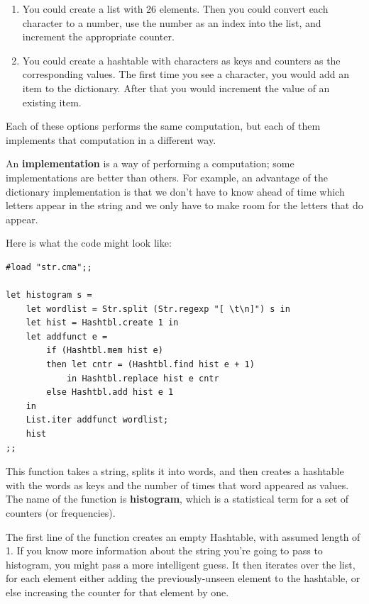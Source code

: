 \documentclass[10pt]{book}
\begin{document}
{\begin{enumerate}
\item You could create a list with 26 elements.  Then you could
convert each character to a number, use the number as an index 
into the list, and increment the appropriate counter.

\item You could create a hashtable with characters as keys
and counters as the corresponding values.  The first time you
see a character, you would add an item to the dictionary.  After
that you would increment the value of an existing item.

\end{enumerate}

Each of these options performs the same computation, but each
of them implements that computation in a different way.


An {\bf implementation} is a way of performing a computation;
some implementations are better than others.  For example,
an advantage of the dictionary implementation is that we don't
have to know ahead of time which letters appear in the string
and we only have to make room for the letters that do appear.

Here is what the code might look like:

\beforeverb
\begin{verbatim}
#load "str.cma";;

let histogram s = 
	let wordlist = Str.split (Str.regexp "[ \t\n]") s in
	let hist = Hashtbl.create 1 in
	let addfunct e = 
		if (Hashtbl.mem hist e)
		then let cntr = (Hashtbl.find hist e + 1)
			in Hashtbl.replace hist e cntr
		else Hashtbl.add hist e 1
	in
	List.iter addfunct wordlist;
	hist
;;\end{verbatim}
\afterverb
%
This function takes a string, splits it into words, and then creates a 
hashtable with the words as keys and the number of times that word 
appeared as values. The name of the function is {\bf histogram}, which 
is a statistical term for a set of counters (or frequencies).


The first line of the function creates an empty Hashtable, with assumed 
length of 1. If you know more information about the string you're going 
to pass to histogram, you might pass a more intelligent guess. It then 
iterates over the list, for each element either adding the previously-unseen
element to the hashtable, or else increasing the counter for that 
element by one.

}
\end{document}
